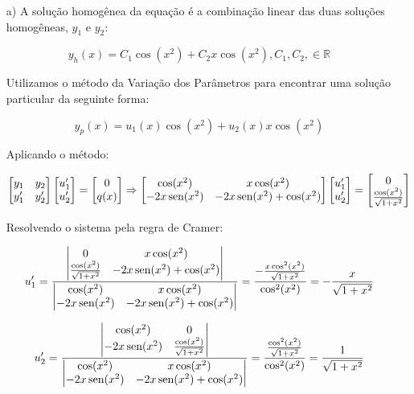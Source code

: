 \documentclass[12pt,a4paper]{article}
\newcommand{\re}{\mathbb{R}}
\newcommand{\sen}{\mbox{\,sen}}
\begin{document}
\begin{itemize}
\item[a)] A solução homogênea da equação é a combinação linear das duas soluções homogêneas, $y_1$ e $y_2$:

$$ y_h (x) = C_1 \cos(x^2) + C_2 x \cos(x^2), C_1, C_2, \in \re $$

Utilizamos o método da Variação dos Parâmetros para encontrar uma solução particular da seguinte forma:

$$ y_p (x) = u_1(x) \cos(x^2) + u_2(x) x \cos(x^2) $$

Aplicando o método:

$$
\begin{bmatrix}
y_1 & y_2 \\
y_1' & y_2'
\end{bmatrix}
\begin{bmatrix}
u_1' \\
u_2'
\end{bmatrix}
= 
\begin{bmatrix}
0 \\
q(x)
\end{bmatrix}
\Rightarrow
\begin{bmatrix}
\cos(x^2) & x\cos(x^2) \\
-2x\sen(x^2) & -2x\sen(x^2) + \cos(x^2)
\end{bmatrix}
\begin{bmatrix}
u_1' \\
u_2'
\end{bmatrix}
= 
\begin{bmatrix}
0 \\
\frac{\cos(x^2)}{\sqrt{1+x^2}}
\end{bmatrix}
$$

Resolvendo o sistema pela regra de Cramer:

$$ u_1' = \frac{ \begin{vmatrix}
0 & x\cos(x^2) \\
\frac{\cos(x^2)}{\sqrt{1+x^2}} & -2x\sen(x^2) + \cos(x^2)
\end{vmatrix}  }{ \begin{vmatrix}
\cos(x^2) & x\cos(x^2) \\
-2x\sen(x^2) & -2x\sen(x^2) + \cos(x^2)
\end{vmatrix} }
= \frac{ - \frac{ x \cos^2 (x^2)}{\sqrt{1+x^2}} }{ \cos^2(x^2) } = -\frac{x}{\sqrt{1+x^2}}
 $$
 
 $$ u_2' = \frac{ \begin{vmatrix}
\cos(x^2) & 0 \\
-2x\sen(x^2) & \frac{\cos(x^2)}{\sqrt{1+x^2}}
\end{vmatrix}  }{ \begin{vmatrix}
\cos(x^2) & x\cos(x^2) \\
-2x\sen(x^2) & -2x\sen(x^2) + \cos(x^2)
\end{vmatrix} }
= \frac{  \frac{ \cos^2 (x^2)}{\sqrt{1+x^2}} }{ \cos^2(x^2) } = \frac{1}{\sqrt{1+x^2}}
 $$


\end{itemize}
\end{document}
